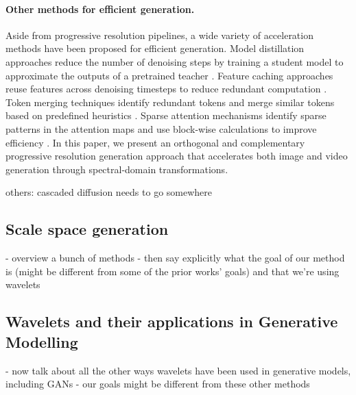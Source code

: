 \paragraph{Other methods for efficient generation.} Aside from progressive resolution pipelines, a wide variety of acceleration methods have been proposed for efficient generation. Model distillation approaches reduce the number of denoising steps by training a student model to approximate the outputs of a pretrained teacher \cite{dmd, dmd2, causvid, lcm, pcm, prog-dist}. Feature caching approaches reuse features across denoising timesteps to reduce redundant computation \cite{teacache, toca, freqca, ma2023deepcache}. Token merging techniques identify redundant tokens and merge similar tokens based on predefined heuristics \cite{lu2025toma, haurum2024agglomerative, bolya2023token, kim2024tokenfusion, wu2025importance, lee2025local, fang2025attend}. Sparse attention mechanisms identify sparse patterns in the attention maps and use block-wise calculations to improve efficiency \cite{li2025radial, xia2025trainingfree, zhan2025bidirectional, katharopoulos202linear, wang2020linformer, choromanski2021performer, beltagy2020longformer}. In this paper, we present an orthogonal and complementary progressive resolution generation approach that accelerates both image and video generation through spectral-domain transformations.




\iffalse
others: cascaded diffusion needs to go somewhere


\subsection{Scale space generation}
- overview a bunch of methods
- then say explicitly what the goal of our method is (might be different from some of the prior works' goals) and that we're using wavelets

\subsection{Wavelets and their applications in Generative Modelling}
- now talk about all the other ways wavelets have been used in generative models, including GANs
- our goals might be different from these other methods

